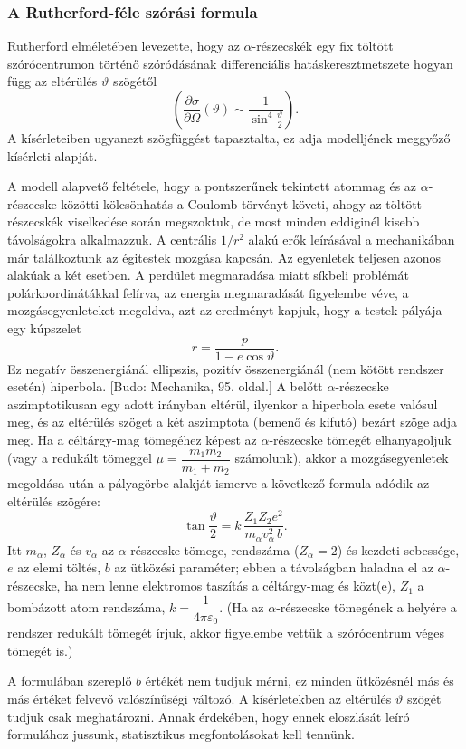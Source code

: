 \documentclass[../main.tex]{subfiles}
\begin{document}
\subsubsection{A Rutherford-féle szórási formula}
Rutherford elméletében levezette, hogy az $\alpha$-részecskék egy fix
töltött szórócentrumon történő szóródásának differenciális
hatáskeresztmetszete hogyan függ az eltérülés $\vartheta$ szögétől
\[
\left(\frac{\partial\sigma}{\partial\Omega}(\vartheta)\sim\frac{1}{\sin^4\!\tfrac{\vartheta}{2}}\right).
\]
A kísérleteiben ugyanezt szögfüggést tapasztalta, ez adja modelljének
meggyőző kísérleti alapját.

A modell alapvető feltétele, hogy a pontszerűnek tekintett atommag és az
$\alpha$-részecske közötti kölcsönhatás a Coulomb-törvényt követi, ahogy az
töltött részecskék viselkedése során megszoktuk, de most minden eddiginél
kisebb távolságokra alkalmazzuk.
A centrális $1/r^2$ alakú erők leírásával a mechanikában már találkoztunk
az égitestek mozgása kapcsán.
Az egyenletek teljesen azonos alakúak a két esetben.
A perdület megmaradása miatt síkbeli problémát polárkoordinátákkal
felírva, az energia megmaradását figyelembe véve, a mozgásegyenleteket
megoldva, azt az eredményt kapjuk, hogy a testek pályája egy kúpszelet
\[
r=\frac{p}{1-e\cos\vartheta}.
\]
Ez negatív összenergiánál ellipszis, pozitív összenergiánál (nem kötött
rendszer esetén) hiperbola.
[Budo: Mechanika, 95. oldal.]
A belőtt $\alpha$-részecske aszimptotikusan egy adott irányban eltérül,
ilyenkor a hiperbola esete valósul meg, és az eltérülés szöget a két
aszimptota (bemenő és kifutó) bezárt szöge adja meg.
Ha a céltárgy-mag tömegéhez képest az $\alpha$-részecske tömegét
elhanyagoljuk (vagy a redukált tömeggel
$\mu=\dfrac{m_1 m_2}{m_1+m_2}$ számolunk), akkor a mozgásegyenletek
megoldása után a pályagörbe alakját ismerve a következő formula adódik
az eltérülés szögére:
\[
\tan\frac{\vartheta}{2}
= k\,\frac{Z_1 Z_2 e^2}{m_\alpha v_\alpha^2\, b}.
\]
Itt $m_\alpha$, $Z_\alpha$ és $v_\alpha$ az $\alpha$-részecske tömege,
rendszáma ($Z_\alpha=2$) és kezdeti sebessége, $e$ az elemi töltés,
$b$ az ütközési paraméter;
ebben a távolságban haladna el az $\alpha$-részecske, ha nem lenne
elektromos taszítás a céltárgy-mag és közt(e),
$Z_1$ a bombázott atom rendszáma, $k=\dfrac{1}{4\pi\varepsilon_0}$.
(Ha az $\alpha$-részecske tömegének a helyére a rendszer redukált
tömegét írjuk, akkor figyelembe vettük a szórócentrum véges tömegét is.)

A formulában szereplő $b$ értékét nem tudjuk mérni, ez minden ütközésnél
más és más értéket felvevő valószínűségi változó.
A kísérletekben az eltérülés $\vartheta$ szögét tudjuk csak
meghatározni.
Annak érdekében, hogy ennek eloszlását leíró formulához jussunk,
statisztikus megfontolásokat kell tennünk.
\end{document}
